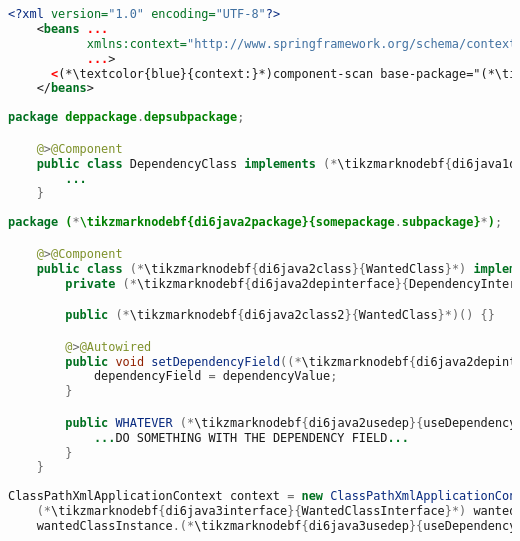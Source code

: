\label{setterinjectionautowire}
\begin{lstlisting}[language=XML, title={Configuration XML}]
    <?xml version="1.0" encoding="UTF-8"?>
    <beans ...
           xmlns:context="http://www.springframework.org/schema/context"
           ...>
      <(*\textcolor{blue}{context:}*)component-scan base-package="(*\tikzmarknodebf{di6xml1package}{somepackage.subpackage}[ForestGreen]*)"/>
    </beans>
\end{lstlisting}
\begin{lstlisting}[language=Java, title={Dependency class}]
    package deppackage.depsubpackage;

    @>@Component
    public class DependencyClass implements (*\tikzmarknodebf{di6java1depinterface}{DependencyInterface}*) {
        ...
    }
\end{lstlisting}
\begin{lstlisting}[language=Java, title={Wanted class with the zero--parameter constructor and the setter method}]
    package (*\tikzmarknodebf{di6java2package}{somepackage.subpackage}*);

    @>@Component
    public class (*\tikzmarknodebf{di6java2class}{WantedClass}*) implements (*\tikzmarknodebf{di6java2interface}{WantedClassInterface}*) {
        private (*\tikzmarknodebf{di6java2depinterface}{DependencyInterface}*) dependencyField;

        public (*\tikzmarknodebf{di6java2class2}{WantedClass}*)() {}

        @>@Autowired
        public void setDependencyField((*\tikzmarknodebf{di6java2depinterface2}{DependencyInterface}*) dependencyValue){
            dependencyField = dependencyValue;
        }

        public WHATEVER (*\tikzmarknodebf{di6java2usedep}{useDependency}*)() {
            ...DO SOMETHING WITH THE DEPENDENCY FIELD...
        }
    }
\end{lstlisting}
\begin{lstlisting}[language=Java, title={Usage}]
    ClassPathXmlApplicationContext context = new ClassPathXmlApplicationContext("configurationFile.xml");
    (*\tikzmarknodebf{di6java3interface}{WantedClassInterface}*) wantedClassInstance = context.getBean("(*\tikzmarknodebf{di6java3beanid}{wantedClass}[ForestGreen]*)", (*\tikzmarknodebf{di6java3interface2}{WantedClassInterface}*).class);
    wantedClassInstance.(*\tikzmarknodebf{di6java3usedep}{useDependency}*)();
\end{lstlisting}
\newpage

